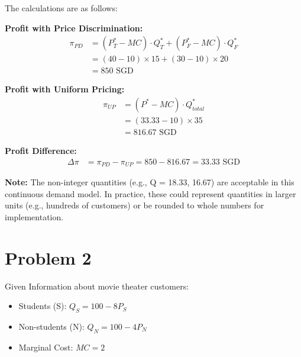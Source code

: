 \documentclass[12pt]{article}
\begin{document}
\begin{enumerate}[label=(\alph*)]
The calculations are as follows:

\textbf{Profit with Price Discrimination:}
\begin{align*}
\pi_{PD} &= (P_T^* - MC) \cdot Q_T^* + (P_F^* - MC) \cdot Q_F^* \\
&= (40 - 10)\times 15 + (30 - 10)\times 20 \\
&= 850 \text{ SGD}
\end{align*}

\textbf{Profit with Uniform Pricing:}
\begin{align*}
\pi_{UP} &= (P^* - MC) \cdot Q_{total}^* \\
&= (33.33 - 10) \times 35 \\
&= 816.67 \text{ SGD}
\end{align*}

\textbf{Profit Difference:}
\begin{align*}
\Delta\pi &= \pi_{PD} - \pi_{UP} = 850 - 816.67 = 33.33 \text{ SGD}
\end{align*}

\end{enumerate}
\textbf{Note:} The non-integer quantities (e.g., Q = 18.33, 16.67) are acceptable in this continuous demand model. In practice, these could represent quantities in larger units (e.g., hundreds of customers) or be rounded to whole numbers for implementation.

\section*{Problem 2}
Given Information about movie theater customers:
\begin{itemize}
    \item Students (S): $Q_S = 100 - 8P_S$
    \item Non-students (N): $Q_N = 100 - 4P_N$
    \item Marginal Cost: $MC = 2$
\end{itemize}
\end{document}

